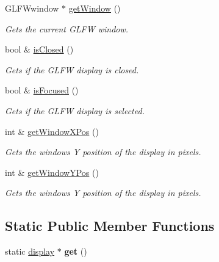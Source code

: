 \begin{DoxyCompactItemize}
G\+L\+F\+Wwindow $\ast$ \hyperlink{classflounder_1_1display_a5cdcd3dddce4cf63ac45503b03e96689}{get\+Window} ()
\begin{DoxyCompactList}\small\item\em Gets the current G\+L\+FW window. \end{DoxyCompactList}\item 
bool \& \hyperlink{classflounder_1_1display_afc0a47cb7ce2423076e4868b6b280fea}{is\+Closed} ()
\begin{DoxyCompactList}\small\item\em Gets if the G\+L\+FW display is closed. \end{DoxyCompactList}\item 
bool \& \hyperlink{classflounder_1_1display_a8319a69deefd25fb5b1d7dddabd35df9}{is\+Focused} ()
\begin{DoxyCompactList}\small\item\em Gets if the G\+L\+FW display is selected. \end{DoxyCompactList}\item 
int \& \hyperlink{classflounder_1_1display_acd9fd5a794f2c31633d5e0a707b53861}{get\+Window\+X\+Pos} ()
\begin{DoxyCompactList}\small\item\em Gets the windows Y position of the display in pixels. \end{DoxyCompactList}\item 
int \& \hyperlink{classflounder_1_1display_a59dab9f2452adfce71b7d156dc9ca688}{get\+Window\+Y\+Pos} ()
\begin{DoxyCompactList}\small\item\em Gets the windows Y position of the display in pixels. \end{DoxyCompactList}\end{DoxyCompactItemize}
\subsection*{Static Public Member Functions}
\begin{DoxyCompactItemize}
\item 
\mbox{\label{classflounder_1_1display_a7c7015939f48bf4526bb0330ea4fcd2f}} 
static \hyperlink{classflounder_1_1display}{display} $\ast$ {\bfseries get} ()
\end{DoxyCompactItemize}
